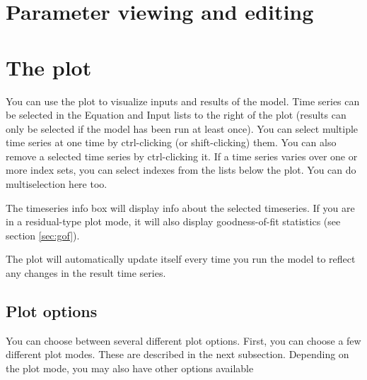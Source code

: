 \documentclass[11pt]{article}
\theoremstyle{definition}
\begin{document}
\section{Parameter viewing and editing}

\section{The plot}

You can use the plot to visualize inputs and results of the model. Time series can be selected in the Equation and Input lists to the right of the plot (results can only be selected if the model has been run at least once). You can select multiple time series at one time by ctrl-clicking (or shift-clicking) them. You can also remove a selected time series by ctrl-clicking it. If a time series varies over one or more index sets, you can select indexes from the lists below the plot. You can do multiselection here too.

The timeseries info box will display info about the selected timeseries. If you are in a residual-type plot mode, it will also display goodness-of-fit statistics (see section \ref{sec:gof}).

The plot will automatically update itself every time you run the model to reflect any changes in the result time series.

\subsection{Plot options}
You can choose between several different plot options. First, you can choose a few different plot modes. These are described in the next subsection. Depending on the plot mode, you may also have other options available
\end{document}

